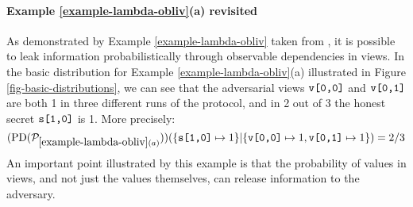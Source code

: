 \paragraph{Example \ref{example-lambda-obliv}(a) revisited} As demonstrated
by Example \ref{example-lambda-obliv} taken from \cite{darais2019language}, it is possible
to leak information probabilistically through observable dependencies
in views. In the basic distribution for Example \ref{example-lambda-obliv}(a)
illustrated in Figure \ref{fig-basic-distributions}, we can see that
the adversarial views $\texttt{v[0,0]}$ and $\texttt{v[0,1]}$ are both 1 in
three different runs of the protocol, and in 2 out of 3 the
honest secret $\texttt{s[1,0]}$ is 1. More precisely:
$$
(\mathrm{PD}(\mathcal{P}_{\ref{example-lambda-obliv}(a)}))(\{\texttt{s[1,0]} \mapsto 1 \}|\{ \texttt{v[0,0]} \mapsto 1, \texttt{v[0,1]} \mapsto 1 \}) = 2/3
$$
An important point illustrated by this example is that the
probability of values in views, and not just the values themselves,
can release information to the adversary.

